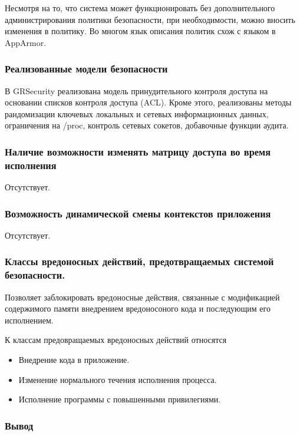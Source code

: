 Несмотря на то, что система может функционировать 
без дополнительного администрирования политики 
безопасности, при необходимости, можно вносить 
изменения в политику. Во многом язык описания 
политик схож с языком в AppArmor. 

\subsubsection{Реализованные модели безопасности} 

В GRSecurity реализована модель принудительного контроля 
доступа на основании списков контроля доступа (ACL).
Кроме этого, реализованы методы рандомизации ключевых 
локальных и сетевых информационных данных, 
ограничения на /proc, контроль сетевых сокетов, 
добавочные функции аудита.   

\subsubsection{Наличие возможности изменять матрицу доступа во время 
	исполнения} 

Отсутствует.

\subsubsection{Возможность динамической смены контекстов приложения} 

Отсутствует. 

\subsubsection{Классы вредоносных действий, предотвращаемых 
	системой безопасности.} 

Позволяет заблокировать вредоносные действия, связанные 
с модификацией содержимого памяти внедрением вредоносоного 
кода и последующим его исполнением. 

К классам предовращаемых вредоносных действий относятся 
\begin{itemize} 
\item Внедрение кода в приложение. 
\item Изменение нормального течения исполнения процесса. 
\item Исполнение программы с повышенными привилегиями. 
\end{itemize} 

\subsubsection{Вывод}

